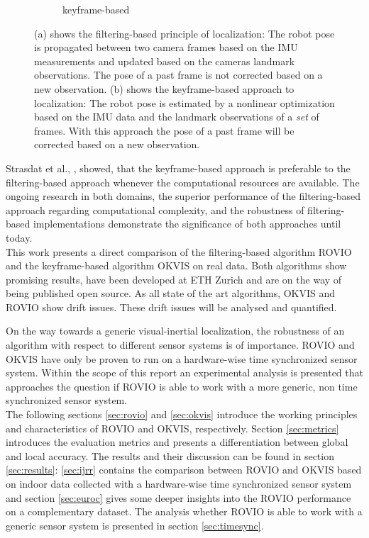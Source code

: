 \begin{figure}
\begin{subfigure}[b]{0.4\textwidth}
    \caption{keyframe-based}
    \label{fig:2}
  \end{subfigure}
\caption{(a) shows the filtering-based principle of localization: The robot pose is propagated between two camera frames based on the IMU measurements and updated based on the cameras landmark observations. The pose of a past frame is not corrected based on a new observation. (b) shows the keyframe-based approach to localization: The robot pose is estimated by a nonlinear optimization based on the IMU data and the landmark observations of a \textit{set} of frames. With this approach the pose of a past frame will be corrected based on a new observation.}
\label{pics:filtering_keyframe}
\end{figure}

Strasdat et al., \cite{strasdat2010real}, showed, that the keyframe-based approach is preferable to the filtering-based approach whenever the computational resources are available. The ongoing research in both domains, the superior performance of the filtering-based approach regarding computational complexity, and the robustness of filtering-based implementations demonstrate the significance of both approaches until today. \\

This work presents a direct comparison of the filtering-based algorithm ROVIO and the keyframe-based algorithm OKVIS on real data. Both algorithms show promising results, have been developed at ETH Zurich and are on the way of being published open source. As all state of the art algorithms, OKVIS and ROVIO show drift issues. These drift issues will be analysed and quantified. 

On the way towards a generic visual-inertial localization, the robustness of an algorithm with respect to different sensor systems is of importance. ROVIO and OKVIS have only be proven to run on a hardware-wise time synchronized sensor system. Within the scope of this report an experimental analysis is presented that approaches the question if ROVIO is able to work with a more generic, non time synchronized sensor system. \\

The following sections \ref{sec:rovio} and \ref{sec:okvis} introduce the working principles and characteristics of ROVIO and OKVIS, respectively. Section \ref{sec:metrics} introduces the evaluation metrics and presents a differentiation between global and local accuracy. The results and their discussion can be found in section \ref{sec:results}: \ref{sec:ijrr} contains the comparison between ROVIO and OKVIS based on indoor data collected with a hardware-wise time synchronized sensor system and section \ref{sec:euroc} gives some deeper insights into the ROVIO performance on a complementary dataset. The analysis whether ROVIO is able to work with a generic sensor system is presented in section \ref{sec:timesync}. \\
